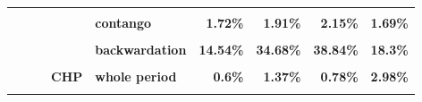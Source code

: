 \documentclass[
  authoryear,
  preprint,
  3p]{elsarticle}
\begin{document}
\begin{landscape}
\begin{longtable}[t]{>{}l>{}l>{}l>{}l>{}l>{}r>{}r>{}r>{}r}
\textbf{\cellcolor{gray!10}{}} & \textbf{\cellcolor{gray!10}{}} & \textbf{\cellcolor{gray!10}{}} & \textbf{\cellcolor{gray!10}{}} & \textbf{\cellcolor{gray!10}{backwardation}} & \textcolor[HTML]{4285f4}{\textbf{\cellcolor{gray!10}{1.2\%}}} & \textcolor[HTML]{4285f4}{\textbf{\cellcolor{gray!10}{1.27\%}}} & \textcolor[HTML]{4285f4}{\textbf{\cellcolor{gray!10}{1.93\%}}} & \textcolor[HTML]{4285f4}{\textbf{\cellcolor{gray!10}{3.55\%}}}\\
\addlinespace
\textbf{} & \textbf{} & \textbf{} & \textbf{} & \textbf{contango} & \textcolor[HTML]{4285f4}{\textbf{1.72\%}} & \textcolor[HTML]{4285f4}{\textbf{1.91\%}} & \textcolor[HTML]{4285f4}{\textbf{2.15\%}} & \textcolor[HTML]{4285f4}{\textbf{1.69\%}}\\
\textbf{\cellcolor{gray!10}{}} & \textbf{\cellcolor{gray!10}{}} & \textbf{\cellcolor{gray!10}{grains}} & \textbf{\cellcolor{gray!10}{market}} & \textbf{\cellcolor{gray!10}{whole period}} & \textcolor[HTML]{4285f4}{\textbf{\cellcolor{gray!10}{16.44\%}}} & \textcolor[HTML]{4285f4}{\textbf{\cellcolor{gray!10}{29.28\%}}} & \textcolor[HTML]{4285f4}{\textbf{\cellcolor{gray!10}{42.09\%}}} & \textcolor[HTML]{4285f4}{\textbf{\cellcolor{gray!10}{19.27\%}}}\\
\textbf{} & \textbf{} & \textbf{} & \textbf{} & \textbf{backwardation} & \textcolor[HTML]{4285f4}{\textbf{14.54\%}} & \textcolor[HTML]{4285f4}{\textbf{34.68\%}} & \textcolor[HTML]{4285f4}{\textbf{38.84\%}} & \textcolor[HTML]{4285f4}{\textbf{18.3\%}}\\
\textbf{\cellcolor{gray!10}{}} & \textbf{\cellcolor{gray!10}{}} & \textbf{\cellcolor{gray!10}{}} & \textbf{\cellcolor{gray!10}{}} & \textbf{\cellcolor{gray!10}{contango}} & \textcolor[HTML]{4285f4}{\textbf{\cellcolor{gray!10}{18.73\%}}} & \textcolor[HTML]{4285f4}{\textbf{\cellcolor{gray!10}{23.95\%}}} & \textcolor[HTML]{4285f4}{\textbf{\cellcolor{gray!10}{44.4\%}}} & \textcolor[HTML]{4285f4}{\textbf{\cellcolor{gray!10}{20.71\%}}}\\
\textbf{} & \textbf{} & \textbf{} & \textbf{CHP} & \textbf{whole period} & \textcolor[HTML]{4285f4}{\textbf{0.6\%}} & \textcolor[HTML]{4285f4}{\textbf{1.37\%}} & \textcolor[HTML]{4285f4}{\textbf{0.78\%}} & \textcolor[HTML]{4285f4}{\textbf{2.98\%}}\\
\addlinespace
\textbf{\cellcolor{gray!10}{}} & \textbf{\cellcolor{gray!10}{}} & \textbf{\cellcolor{gray!10}{}} & \textbf{\cellcolor{gray!10}{}} & \textbf{\cellcolor{gray!10}{backwardation}} & \textcolor[HTML]{4285f4}{\textbf{\cellcolor{gray!10}{0.77\%}}} & \textcolor[HTML]{4285f4}{\textbf{\cellcolor{gray!10}{2.63\%}}} & \textcolor[HTML]{4285f4}{\textbf{\cellcolor{gray!10}{1.04\%}}} & \textcolor[HTML]{4285f4}{\textbf{\cellcolor{gray!10}{5.46\%}}}\\

\end{longtable}
\end{landscape}
\end{document}
